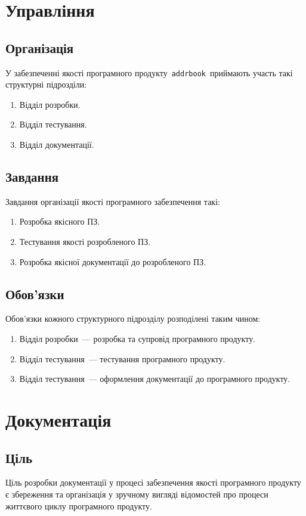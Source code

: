 \documentclass[a4paper,oneside,DIV=12,12pt]{scrartcl}
\newcommand{\progname}{\texttt{addrbook}}
\begin{document}
		\section{Управління}
			\subsection{Організація}
				У забезпеченні якості програмного продукту~\progname \ приймають участь такі структурні підрозділи:
				\begin{enumerate}
					\item Відділ розробки.
					\item Відділ тестування.
					\item Відділ документації.
				\end{enumerate}
				
			\subsection{Завдання}
				Завдання організації якості програмного забезпечення такі:
				\begin{enumerate}
					\item Розробка якісного ПЗ.
					\item Тестування якості розробленого ПЗ.
					\item Розробка якісної документації до розробленого ПЗ.
				\end{enumerate}
				
			\subsection{Обов'язки}
				Обов'язки кожного структурного підрозділу розподілені таким чином:
				\begin{enumerate}
					\item Відділ розробки~— розробка та супровід програмного продукту.
					\item Відділ тестування~— тестування програмного продукту.
					\item Відділ тестування~— оформлення документації до програмного продукту.
				\end{enumerate}
				
		\section{Документація}
			\subsection{Ціль}
				Ціль розробки документації у процесі забезпечення якості програмного продукту є збереження та організація у зручному вигляді відомостей про процеси життєвого циклу програмного продукту.
				
\end{document}
